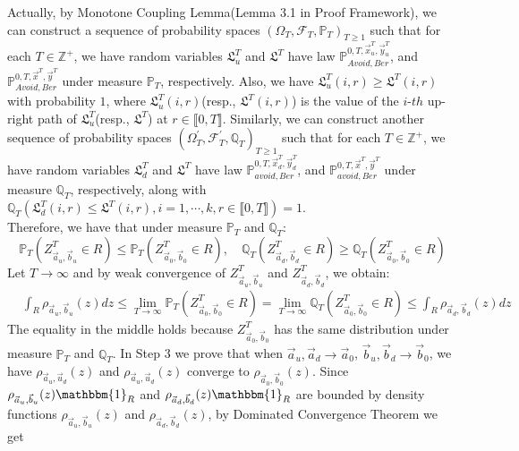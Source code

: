 \documentclass[12pt]{article}
\begin{document}
Actually, by Monotone Coupling Lemma(Lemma 3.1 in Proof Framework), we can construct a sequence of probability spaces $(\Omega_{T},\mathcal{F}_{T},\mathbb{P}_{T})_{T\geqslant 1}$ such that for each $T\in\mathbb{Z}^{+}$, we have random variables $\mathfrak{L}_{u}^{T}$ and $\mathfrak{L}^{T}$ have law $\mathbb{P}_{Avoid,Ber}^{0,T,\vec{x}^{T}_{u},\vec{y}^{T}_{u}}$, and $\mathbb{P}_{Avoid,Ber}^{0,T,\vec{x}^{T},\vec{y}^{T}}$ under measure $\mathbb{P}_{T}$, respectively. Also, we have $\mathfrak{L}_{u}^{T}(i,r)\geqslant \mathfrak{L}^{T}(i,r)$ with probability $1$, where $\mathfrak{L}_{u}^{T}(i,r)$(resp., $\mathfrak{L}^{T}(i,r)$) is the value of the $i$-$th$ up-right path of $\mathfrak{L}_{u}^{T}$(resp., $\mathfrak{L}^{T}$) at $r\in\llbracket 0,T\rrbracket$. Similarly, we can construct another sequence of probability spaces $(\Omega_{T}^{\prime},\mathcal{F}_{T}^{\prime},\mathbb{Q}_{T})_{T\geqslant 1}$ such that for each $T\in\mathbb{Z}^{+}$, we have random variables $\mathfrak{L}_{d}^{T}$ and $\mathfrak{L}^{T}$ have law $\mathbb{P}_{avoid,Ber}^{0,T,\vec{x}^{T}_{d},\vec{y}^{T}_{d}}$, and $\mathbb{P}_{avoid,Ber}^{0,T,\vec{x}^{T},\vec{y}^{T}}$ under measure $\mathbb{Q}_{T}$, respectively, along with $\mathbb{Q}_{T}(\mathfrak{L}_{d}^{T}(i,r)\leqslant \mathfrak{L}^{T}(i,r), i=1,\cdots, k, r\in\llbracket 0,T\rrbracket)=1$.\\
Therefore, we have that under measure $\mathbb{P}_{T}$ and $\mathbb{Q}_{T}$:
$$\mathbb{P}_{T}(Z^{T}_{\vec{a}_{u},\vec{b}_{u}}\in R)\leqslant \mathbb{P}_{T}(Z^{T}_{\vec{a}_{0},\vec{b}_{0}}\in R),\quad \mathbb{Q}_{T}(Z^{T}_{\vec{a}_{d},\vec{b}_{d}}\in R)\geqslant \mathbb{Q}_{T}(Z^{T}_{\vec{a}_{0},\vec{b}_{0}}\in R)$$
Let $T\rightarrow\infty$ and by weak convergence of $Z^{T}_{\vec{a}_{u},\vec{b}_{u}}$ and $Z^{T}_{\vec{a}_{d},\vec{b}_{d}}$, we obtain:
\begin{align*}
	&\int_{R}\rho_{\vec{a}_{u},\vec{b}_{u}}(z)dz \leqslant \lim_{T\rightarrow\infty}\mathbb{P}_{T}(Z^{T}_{\vec{a}_{0},\vec{b}_{0}}\in R)=\lim_{T\rightarrow\infty}\mathbb{Q}_{T}(Z^{T}_{\vec{a}_{0},\vec{b}_{0}}\in R)\leqslant \int_{R}\rho_{\vec{a}_{d},\vec{b}_{d}}(z)dz 
\end{align*}
The equality in the middle holds because $Z_{\vec{a}_{0},\vec{b}_{0}}^{T}$ has the same distribution under measure $\mathbb{P}_{T}$ and $\mathbb{Q}_{T}$. In Step 3 we prove that when $\vec{a}_{u},\vec{a}_{d}\rightarrow\vec{a}_{0}$, $\vec{b}_{u},\vec{b}_{d}\rightarrow\vec{b}_{0}$, we have $\rho_{\vec{a}_{u},\vec{u}_{d}}(z)$ and $\rho_{\vec{a}_{u},\vec{u}_{d}}(z)$ converge to $\rho_{\vec{a}_{0},\vec{b}_{0}}(z)$. Since $\rho_{\vec{a}_{u},\vec{b}_{u}}(z)\mathbbm{1}_{R}$ and $\rho_{\vec{a}_{d},\vec{b}_{d}}(z)\mathbbm{1}_{R}$ are bounded by density functions $\rho_{\vec{a}_{u},\vec{b}_{u}}(z)$ and $\rho_{\vec{a}_{d},\vec{b}_{d}}(z)$, by Dominated Convergence Theorem we get
\end{document}

